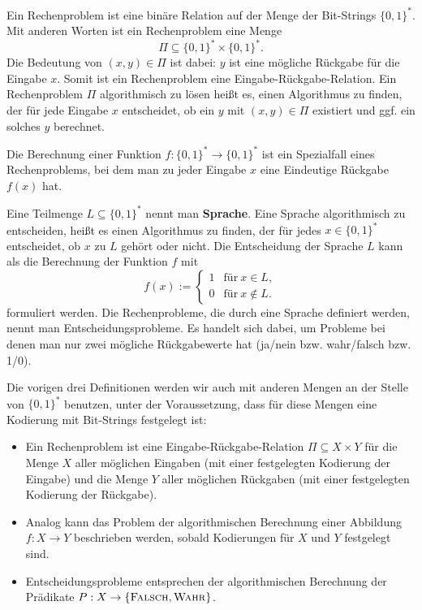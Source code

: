 \begin{defn}
	Ein Rechenproblem ist eine binäre Relation auf der Menge der Bit-Strings $\{0,1\}^\ast$. Mit anderen Worten ist ein Rechenproblem eine Menge 
	\[
	\Pi \subseteq \{0,1\}^\ast \times \{0,1\}^\ast.
	\]
	Die Bedeutung von $(x,y) \in \Pi$ ist dabei: $y$ ist eine mögliche Rückgabe für die Eingabe $x$. Somit ist ein Rechenproblem eine Eingabe-Rückgabe-Relation. Ein Rechenproblem $\Pi$ algorithmisch zu lösen heißt es, einen Algorithmus zu finden, der für jede Eingabe $x$ entscheidet, ob ein $y$ mit $(x,y) \in \Pi$ existiert und ggf. ein solches $y$ berechnet. 
\end{defn} 

\begin{defn}
	Die Berechnung einer Funktion $f : \{0,1\}^\ast \to \{0,1\}^\ast$ ist ein Spezialfall eines Rechenproblems, bei dem man zu jeder Eingabe $x$ eine Eindeutige Rückgabe $f(x)$ hat. 
\end{defn} 

\begin{defn}
	Eine Teilmenge $L \subseteq \{0,1\}^\ast$ nennt man \textbf{Sprache}. Eine Sprache algorithmisch zu entscheiden, heißt es einen Algorithmus zu finden, der für jedes $x \in \{0,1\}^\ast$ entscheidet, ob $x$ zu $L$ gehört oder nicht. Die Entscheidung der Sprache $L$ kann als die Berechnung der Funktion $f $ mit 
	\[
	f(x) := \begin{cases}
		1 & \text{für} \ x \in L, 
		\\ 0 & \text{für} \ x \not\in L.
	\end{cases} 
	\]
	formuliert werden. Die Rechenprobleme, die durch eine Sprache definiert werden, nennt man Entscheidungsprobleme. Es handelt sich dabei, um Probleme bei denen man nur zwei mögliche Rückgabewerte hat (ja/nein bzw. wahr/falsch bzw. 1/0). 
\end{defn}

\begin{bem}
	Die vorigen drei Definitionen werden wir auch mit anderen Mengen an der Stelle von $\{0,1\}^\ast$ benutzen, unter der Voraussetzung, dass für diese Mengen eine Kodierung mit Bit-Strings festgelegt ist:
	\begin{itemize}
		\item Ein Rechenproblem ist eine Eingabe-Rückgabe-Relation $\Pi \subseteq  X \times Y$ für die Menge $X$ aller möglichen Eingaben (mit einer festgelegten Kodierung der Eingabe) und die Menge $Y$ aller möglichen Rückgaben (mit einer festgelegten Kodierung der Rückgabe). 
		\item Analog kann das Problem der algorithmischen Berechnung einer Abbildung $f : X \to Y$ beschrieben werden, sobald Kodierungen für $X$ und $Y$ festgelegt sind. 
		\item Entscheidungsprobleme entsprechen der algorithmischen Berechnung der Prädikate $P : X \to \{\mathop{\text{\textsc{Falsch}}},\mathop{\text{\textsc{Wahr}}}\}$. 
	\end{itemize} 
\end{bem} 


